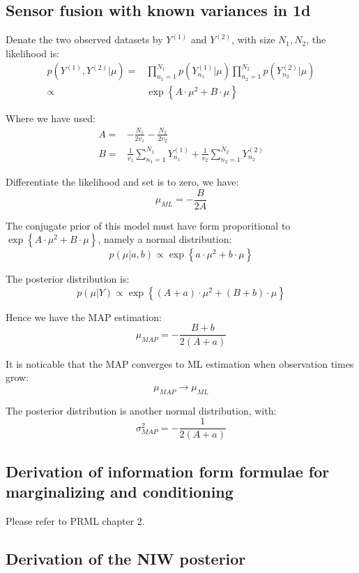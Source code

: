 \documentclass[UTF8]{ctexart}
\begin{document}
\subsection{Sensor fusion with known variances in 1d}
Denate the two observed datasets by $Y^{(1)}$ and $Y^{(2)}$, with size $N_{1},N_{2}$, the likelihood is:
\begin{align}
p(Y^{(1)},Y^{(2)}|\mu)=&\prod_{n_{1}=1}^{N_{1}}p(Y^{(1)}_{n_{1}}|\mu)\prod_{n_{2}=1}^{N_{2}}p(Y^{(2)}_{n_{2}}|\mu)\nonumber \\
\propto& \exp\left\{ A\cdot \mu^{2} + B \cdot \mu \right\} \nonumber 
\end{align}

Where we have used:
\begin{align}
A=&-\frac{N_{1}}{2v_{1}}-\frac{N_{2}}{2v_{2}}\nonumber \\
B=&\frac{1}{v_{1}}\sum_{n_{1}=1}^{N_{1}}Y^{(1)}_{n_{1}} + \frac{1}{v_{2}}\sum_{n_{2}=1}^{N_{2}}Y^{(2)}_{n_{2}} \nonumber
\end{align}

Differentiate the likelihood and set is to zero, we have:
$$\mu_{ML} = -\frac{B}{2A}$$

The conjugate prior of this model must have form proporitional to $\exp\left\{A\cdot\mu^{2} + B\cdot\mu\right\}$, namely a normal distribution:
$$p(\mu|a,b) \propto \exp\left\{ a\cdot \mu^{2} + b\cdot \mu \right\}$$

The posterior distribution is:
$$p(\mu|Y) \propto \exp\left\{ (A+a)\cdot \mu^{2} + (B+b)\cdot \mu \right\}$$

Hence we have the MAP estimation:
$$\mu_{MAP} = -\frac{B+b}{2(A+a)}$$

It is noticable that the MAP converges to ML estimation when observation times grow:
$$\mu_{MAP} \rightarrow \mu_{ML}$$

The posterior distribution is another normal distribution, with:
$$\sigma^{2}_{MAP} = -\frac{1}{2(A+a)}$$

\subsection{Derivation of information form formulae for marginalizing and conditioning}
Please refer to PRML chapter 2.

\subsection{Derivation of the NIW posterior}
\end{document}
